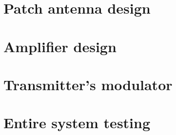 \documentclass[12pt,a4paper]{report}
\begin{document}
\chapter*{Patch antenna design}
\chapter*{Amplifier design}
\chapter*{Transmitter's modulator}
\chapter*{Entire system testing}

    
\end{document}
